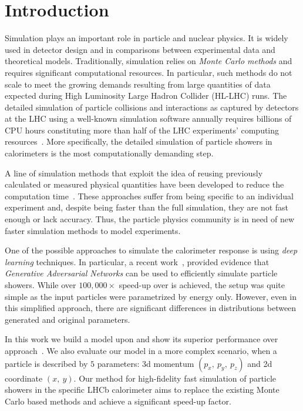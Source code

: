 \section{Introduction}

Simulation plays an important role in particle and nuclear physics. It is widely used in detector design and in comparisons between experimental data and theoretical models. Traditionally, simulation relies on \textit{Monte Carlo methods} and requires significant computational resources. In particular, such methods do not scale to meet the growing demands resulting from large quantities of data expected during High Luminosity Large Hadron Collider (HL-LHC) runs. The detailed simulation of particle collisions and interactions as captured by detectors at the LHC using a well-known simulation software \geant annually requires billions of CPU hours constituting more than half of the LHC experiments' computing resources~\cite{bozzi2014,flynn2015computing}. More specifically, the detailed simulation of particle showers in calorimeters is the most computationally demanding step.
 
A line of simulation methods that exploit the idea of reusing previously calculated or measured physical quantities have been developed to reduce the computation time~\cite{grindhammer2000parameterized,atlas2010simulation}. These approaches suffer from being specific to an individual experiment and, despite being faster than the full simulation, they are not fast enough or lack accuracy. Thus, the particle physics community is in need of new faster simulation methods to model experiments. 
    
One of the possible approaches to simulate the calorimeter response is using \textit{deep learning} techniques. In particular, a recent work~\cite{paganini2017calogan}, provided evidence that \textit{Generative Adversarial Networks} can be used to efficiently simulate particle showers. While over $100,000 \times$ speed-up over \geant is achieved, the setup was quite simple as the input particles were parametrized by energy only. However,  even in this simplified approach, there are significant differences in distributions between generated and original parameters. 

In this work we build a model upon  and show its superior performance over approach~\cite{paganini2017calogan}. We also evaluate our model in a more complex scenario, when a particle is described by $5$ parameters: 3d momentum $(p_x,~ p_y,~ p_z)$ and 2d coordinate $(x,~ y)$. Our method for high-fidelity fast simulation of particle showers in the specific LHCb calorimeter aims to replace the existing Monte Carlo based methods and achieve a significant speed-up factor.
 


